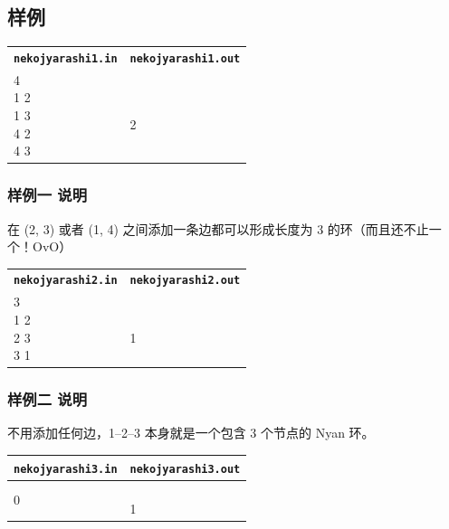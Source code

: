 \documentclass[UTF8, 11pt, a4paper]{article}
\begin{document}
\subsection*{样例}
\begin{table}[h]\centering
\begin{tabularx}{0.8 \textwidth}{|X|X|}
\hline
\texttt{\textbf{nekojyarashi1.in}} & \texttt{\textbf{nekojyarashi1.out}} \\ \hline
{\ttfamily
4 4\newline
1 2\newline
1 3\newline
4 2\newline
4 3
} & {\ttfamily
1\newline
2
}
\\ \hline
\end{tabularx}\end{table}
\subsubsection*{样例一 说明}
在 (2, 3) 或者 (1, 4) 之间添加一条边都可以形成长度为 3 的环（而且还不止一个！OvO）
\newline\newline

\begin{table}[h]\centering
\begin{tabularx}{0.8 \textwidth}{|X|X|}
\hline
\texttt{\textbf{nekojyarashi2.in}} & \texttt{\textbf{nekojyarashi2.out}} \\ \hline
{\ttfamily
3 3\newline
1 2\newline
2 3\newline
3 1
} & {\ttfamily
0\newline
1
}
\\ \hline
\end{tabularx}\end{table}
\subsubsection*{样例二 说明}
不用添加任何边，1--2--3 本身就是一个包含 3 个节点的 Nyan 环。
\newline\newline

\begin{table}[h]\centering
\begin{tabularx}{0.8 \textwidth}{|X|X|}
\hline
\texttt{\textbf{nekojyarashi3.in}} & \texttt{\textbf{nekojyarashi3.out}} \\ \hline
{\ttfamily
3 0
} & {\ttfamily
3\newline
1
}
\\ \hline
\end{tabularx}\end{table}
\end{document}
